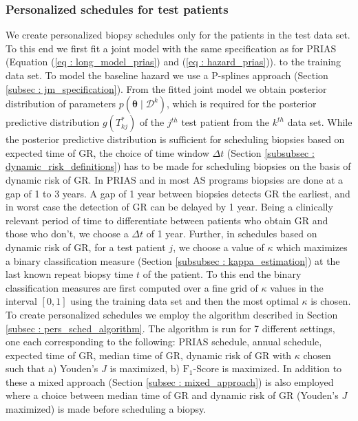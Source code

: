 \subsubsection{Personalized schedules for test patients}
\label{subsubsec : sim_study_pers_sched_details}
We create personalized biopsy schedules only for the patients in the test data set. To this end we first fit a joint model with the same specification as for PRIAS (Equation (\ref{eq : long_model_prias}) and (\ref{eq : hazard_prias})). to the training data set. To model the baseline hazard we use a P-splines approach (Section \ref{subsec : jm_specification}). From the fitted joint model we obtain posterior distribution of parameters $p(\boldsymbol{\theta} \mid \mathcal{D}^k)$, which is required for the posterior predictive distribution $g(T^*_{kj})$ of the $j^{th}$ test patient from the $k^{th}$ data set. While the posterior predictive distribution is sufficient for scheduling biopsies based on expected time of GR, the choice of time window $\Delta t$ (Section \ref{subsubsec : dynamic_risk_definitions}) has to be made for scheduling biopsies on the basis of dynamic risk of GR. In PRIAS and in most AS programs biopsies are done at a gap of 1 to 3 years. A gap of 1 year between biopsies detects GR the earliest, and in worst case the detection of GR can be delayed by 1 year. Being a clinically relevant period of time to differentiate between patients who obtain GR and those who don't, we choose a $\Delta t$ of 1 year. Further, in schedules based on dynamic risk of GR, for a test patient $j$, we choose a value of $\kappa$ which maximizes a binary classification measure (Section \ref{subsubsec : kappa_estimation}) at the last known repeat biopsy time $t$ of the patient. To this end the binary classification measures are first computed over a fine grid of $\kappa$ values in the interval $[0,1]$ using the training data set and then the most optimal $\kappa$ is chosen.\\

To create personalized schedules we employ the algorithm described in Section \ref{subsec : pers_sched_algorithm}. The algorithm is run for 7 different settings, one each corresponding to the following: PRIAS schedule, annual schedule, expected time of GR, median time of GR, dynamic risk of GR with $\kappa$ chosen such that a) Youden's $J$ is maximized, b) $\text{F}_1$-Score is maximized. In addition to these a mixed approach (Section \ref{subsec : mixed_approach}) is also employed where a choice between median time of GR and dynamic risk of GR (Youden's $J$ maximized) is made before scheduling a biopsy.

